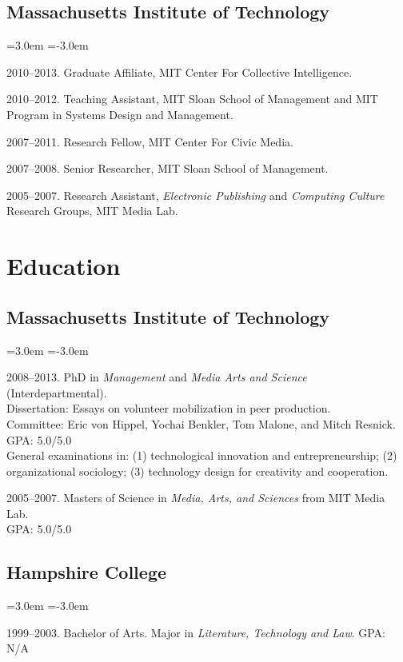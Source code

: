 \documentclass[10pt]{article}
\newenvironment{cvlist}{
\begin{list}{}{\leftmargin=3.0em \itemindent=-3.0em}
  \setlength{\itemsep}{0pt}
  \setlength{\parskip}{0em}
  \setlength{\parsep}{1em}
  \setlength{\parindent}{0em}}
{\vspace{1em}
\end{list}}
\begin{document}
\subsection{Massachusetts Institute of Technology}
\begin{cvlist}
\item 2010--2013. Graduate Affiliate, MIT Center For Collective Intelligence.
\item 2010--2012. Teaching Assistant, MIT Sloan School of Management and MIT Program in Systems Design and Management.
\item 2007--2011. Research Fellow, MIT Center For Civic Media.
\item 2007--2008. Senior Researcher, MIT Sloan School of Management.
\item 2005--2007. Research Assistant, \emph{Electronic Publishing} and \emph{Computing Culture} Research Groups, MIT Media Lab.
\end{cvlist}

\section{Education}

\subsection{Massachusetts Institute of Technology}
\begin{cvlist}

\item 2008--2013. PhD in \emph{Management} and \emph{Media
    Arts and Science} (Interdepartmental). \\
  Dissertation: Essays on volunteer mobilization in peer production. \\
  Committee: Eric von Hippel, Yochai Benkler, Tom Malone, and Mitch Resnick. \\
  GPA: 5.0/5.0 \\
  General examinations in: (1) technological innovation and entrepreneurship; (2) organizational sociology; (3) technology design for creativity and cooperation.

\item 2005--2007. Masters of Science in \emph{Media, Arts, and
    Sciences} from MIT Media Lab.\\ GPA: 5.0/5.0

\end{cvlist}

\subsection{Hampshire College}
\begin{cvlist}
\item 1999--2003. Bachelor of Arts. Major in \emph{Literature,
    Technology and Law}. GPA: N/A
\end{cvlist}
\end{document}
